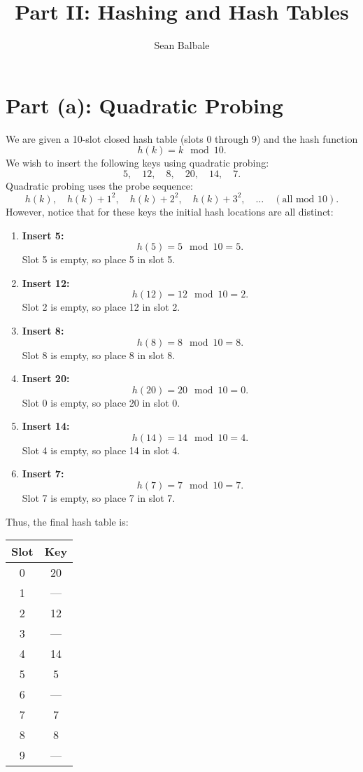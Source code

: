 \documentclass{article}
\begin{document}
\title{Part II: Hashing and Hash Tables}
\author{Sean Balbale}
\date{}
\maketitle

\section*{Part (a): Quadratic Probing}

We are given a 10-slot closed hash table (slots 0 through 9) and the hash function 
\[
h(k)= k \mod 10.
\]
We wish to insert the following keys using quadratic probing:
\[
5,\quad 12,\quad 8,\quad 20,\quad 14,\quad 7.
\]
Quadratic probing uses the probe sequence:
\[
h(k),\quad h(k)+1^2,\quad h(k)+2^2,\quad h(k)+3^2,\quad \dots \quad (\text{all mod }10).
\]
However, notice that for these keys the initial hash locations are all distinct:
\begin{enumerate}[label=\textbf{Step \arabic*:}, leftmargin=1.8cm]
    \item \textbf{Insert 5:} 
    \[
    h(5)=5 \mod 10 = 5.
    \]
    Slot 5 is empty, so place 5 in slot 5.
    \item \textbf{Insert 12:} 
    \[
    h(12)=12 \mod 10 = 2.
    \]
    Slot 2 is empty, so place 12 in slot 2.
    \item \textbf{Insert 8:} 
    \[
    h(8)=8 \mod 10 = 8.
    \]
    Slot 8 is empty, so place 8 in slot 8.
    \item \textbf{Insert 20:} 
    \[
    h(20)=20 \mod 10 = 0.
    \]
    Slot 0 is empty, so place 20 in slot 0.
    \item \textbf{Insert 14:} 
    \[
    h(14)=14 \mod 10 = 4.
    \]
    Slot 4 is empty, so place 14 in slot 4.
    \item \textbf{Insert 7:} 
    \[
    h(7)=7 \mod 10 = 7.
    \]
    Slot 7 is empty, so place 7 in slot 7.
\end{enumerate}

Thus, the final hash table is:

\bigskip
\begin{center}
\begin{tabular}{c|c}
\textbf{Slot} & \textbf{Key} \\ \midrule
0 & 20 \\
1 & --- \\
2 & 12 \\
3 & --- \\
4 & 14 \\
5 & 5 \\
6 & --- \\
7 & 7 \\
8 & 8 \\
9 & --- \\
\end{tabular}
\end{center}
\bigskip
\end{document}
